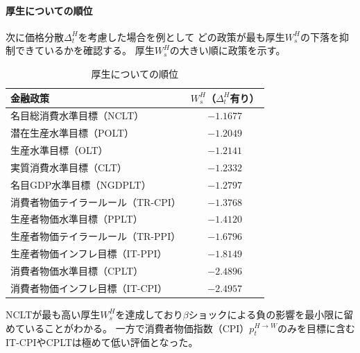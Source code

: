 \paragraph{厚生についての順位}
\label{sec:chapter5_beta_shock_welfare}
次に価格分散\(\Delta_t^H\)を考慮した場合を例として
どの政策が最も厚生\(W_s^H\)の下落を抑制できているかを確認する。
厚生\(W_s^H\)の大きい順に政策を示す。
\begin{table}[H]
\centering
\caption{厚生についての順位}
\label{tab:chapter5_beta_shock_welfare}
\begin{tabular}{lc}
\hline
金融政策 & \(W_s^H\)（\(\Delta_t^H\)有り） \\
\hline
名目総消費水準目標（NCLT） & $-1.1677$ \\
潜在生産水準目標（POLT） & $-1.2049$ \\
生産水準目標（OLT） & $-1.2141$ \\
実質消費水準目標（CLT） & $-1.2332$ \\
名目GDP水準目標（NGDPLT） & $-1.2797$ \\
消費者物価テイラールール（TR-CPI） & $-1.3768$ \\
生産者物価水準目標（PPLT） & $-1.4120$ \\
生産者物価テイラールール（TR-PPI） & $-1.6796$ \\
生産者物価インフレ目標（IT-PPI） & $-1.8149$ \\
消費者物価水準目標（CPLT） & $-2.4896$ \\
消費者物価インフレ目標（IT-CPI） & $-2.4957$ \\
\hline
\end{tabular}
\end{table}
NCLTが最も高い厚生\(W_s^H\)を達成しており\(\beta\)ショックによる負の影響を最小限に留めていることがわかる。
一方で消費者物価指数（CPI）\(p_t^{H\to W}\)のみを目標に含むIT-CPIやCPLTは極めて低い評価となった。